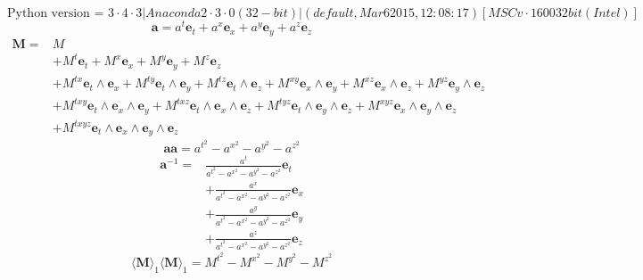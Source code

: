 \documentclass[10pt,fleqn]{report}
\begin{document}
\begin{equation*} \mbox{Python version = } 3 \cdot 4 \cdot 3 |Anaconda 2 \cdot 3 \cdot 0 (32-bit)| (default, Mar  6 2015, 12:08:17) [MSC v \cdot 1600 32 bit (Intel)] \end{equation*}
\begin{equation*} \bm{a} =  a^{t}  \boldsymbol{e}_{t} + a^{x}  \boldsymbol{e}_{x} + a^{y}  \boldsymbol{e}_{y} + a^{z}  \boldsymbol{e}_{z} \end{equation*}
  \begin{align*} \bm{M} =  & M   \\  &  + M^{t}  \boldsymbol{e}_{t} + M^{x}  \boldsymbol{e}_{x} + M^{y}  \boldsymbol{e}_{y} + M^{z}  \boldsymbol{e}_{z} \\  &  + M^{tx}  \boldsymbol{e}_{t}\wedge \boldsymbol{e}_{x} + M^{ty}  \boldsymbol{e}_{t}\wedge \boldsymbol{e}_{y} + M^{tz}  \boldsymbol{e}_{t}\wedge \boldsymbol{e}_{z} + M^{xy}  \boldsymbol{e}_{x}\wedge \boldsymbol{e}_{y} + M^{xz}  \boldsymbol{e}_{x}\wedge \boldsymbol{e}_{z} + M^{yz}  \boldsymbol{e}_{y}\wedge \boldsymbol{e}_{z} \\  &  + M^{txy}  \boldsymbol{e}_{t}\wedge \boldsymbol{e}_{x}\wedge \boldsymbol{e}_{y} + M^{txz}  \boldsymbol{e}_{t}\wedge \boldsymbol{e}_{x}\wedge \boldsymbol{e}_{z} + M^{tyz}  \boldsymbol{e}_{t}\wedge \boldsymbol{e}_{y}\wedge \boldsymbol{e}_{z} + M^{xyz}  \boldsymbol{e}_{x}\wedge \boldsymbol{e}_{y}\wedge \boldsymbol{e}_{z} \\  &  + M^{txyz}  \boldsymbol{e}_{t}\wedge \boldsymbol{e}_{x}\wedge \boldsymbol{e}_{y}\wedge \boldsymbol{e}_{z}  \end{align*} 
\begin{equation*} \bm{a} \bm{a} = a^{t} ^2 - a^{x} ^2 - a^{y} ^2 - a^{z} ^2 \end{equation*}
  \begin{align*} \bm{a}^{-1} =  & \frac{a^{t} }{a^{t} ^2 - a^{x} ^2 - a^{y} ^2 - a^{z} ^2} \boldsymbol{e}_{t} \\  &  + \frac{a^{x} }{a^{t} ^2 - a^{x} ^2 - a^{y} ^2 - a^{z} ^2} \boldsymbol{e}_{x} \\  &  + \frac{a^{y} }{a^{t} ^2 - a^{x} ^2 - a^{y} ^2 - a^{z} ^2} \boldsymbol{e}_{y} \\  &  + \frac{a^{z} }{a^{t} ^2 - a^{x} ^2 - a^{y} ^2 - a^{z} ^2} \boldsymbol{e}_{z}  \end{align*} 
\begin{equation*} \langle \bm{M} \rangle _1 \langle \bm{M} \rangle _1 = M^{t} ^2 - M^{x} ^2 - M^{y} ^2 - M^{z} ^2 \end{equation*}
\end{document}
